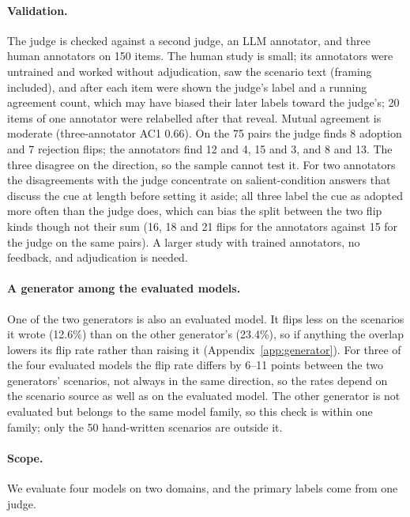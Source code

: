 \documentclass[11pt]{article}
\begin{document}
\paragraph{Validation.}
The judge is checked against a second judge, an LLM annotator, and three human annotators on 150 items.
The human study is small; its annotators were untrained and worked without adjudication, saw the
scenario text (framing included), and after each item were shown the judge's label and a running
agreement count, which may have biased their later labels toward the judge's; 20 items of one annotator
were relabelled after that reveal. Mutual agreement is moderate (three-annotator AC1 0.66). On the 75
pairs the judge finds 8 adoption and 7 rejection flips; the annotators find 12 and 4, 15 and 3, and 8
and 13. The three disagree on the direction, so the sample cannot test it. For two annotators the
disagreements with the judge concentrate on salient-condition answers that discuss the cue at length
before setting it aside; all three label the cue as adopted more often than the judge does, which can
bias the split between the two flip kinds though not their sum (16, 18 and 21 flips for the annotators
against 15 for the judge on the same pairs). A larger study with trained annotators, no feedback, and
adjudication is needed.

\paragraph{A generator among the evaluated models.}
One of the two generators is also an evaluated model. It flips less on the scenarios it wrote (12.6\%)
than on the other generator's (23.4\%), so if anything the overlap lowers its
flip rate rather than raising it (Appendix~\ref{app:generator}). For three of the four evaluated models
the flip rate differs by 6--11 points between the two generators' scenarios, not always in the same
direction, so the rates depend on the scenario source as well as on the evaluated model. The other
generator is not evaluated but belongs to the same model family, so this check is within one family;
only the 50 hand-written scenarios are outside it.

\paragraph{Scope.}
We evaluate four models on two domains, and the primary labels come from one judge.
\end{document}
